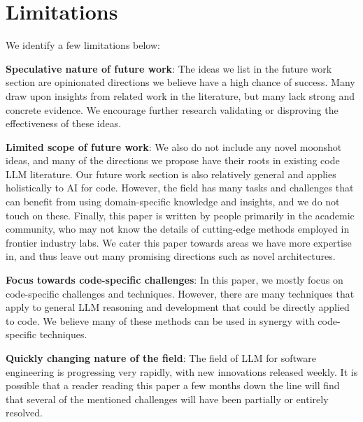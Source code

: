 \section{Limitations}
We identify a few limitations below:

\textbf{Speculative nature of future work}: The ideas we list in the future work section are opinionated directions we believe have a high chance of success. Many draw upon insights from related work in the literature, but many lack strong and concrete evidence. We encourage further research validating or disproving the effectiveness of these ideas.

\textbf{Limited scope of future work}:
We also do not include any novel moonshot ideas, and many of the directions we propose have their roots in existing code LLM literature. Our future work section is also relatively general and applies holistically to AI for code. However, the field has many tasks and challenges that can benefit from using domain-specific knowledge and insights, and we do not touch on these. Finally, this paper is written by people primarily in the academic community, who may not know the details of cutting-edge methods employed in frontier industry labs. We cater this paper towards areas we have more expertise in, and thus leave out many promising directions such as novel architectures. 

\textbf{Focus towards code-specific challenges}: In this paper, we mostly focus on code-specific challenges and techniques. However, there are many techniques that apply to general LLM reasoning and development that could be directly applied to code. We believe many of these methods can be used in synergy with code-specific techniques.

\textbf{Quickly changing nature of the field}: The field of LLM for software engineering is progressing very rapidly, with new innovations released weekly. It is possible that a reader reading this paper a few months down the line will find that several of the mentioned challenges will have been partially or entirely resolved.

